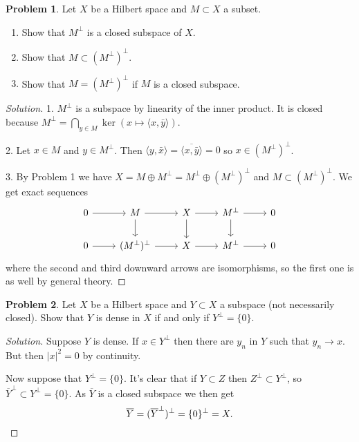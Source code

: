 \documentclass[11pt]{article}
\theoremstyle{definition}
\newtheorem{prob}{Problem}
\def\<{\langle}
\def\>{\rangle}
\begin{document}
\begin{prob}
Let $X$ be a Hilbert space and $M \subset X$ a subset.
\begin{enumerate}
\item
Show that $M^\perp$ is a closed subspace of $X$.

\item
Show that $M \subset (M^\perp)^\perp$.

\item
Show that $M = (M^\perp)^\perp$ if $M$ is a closed subspace.
\end{enumerate}
\end{prob}

\begin{proof}[Solution]
1. $M^\perp$ is a subspace by linearity of the inner product.
It is closed because $M^\perp = \bigcap_{y \in M} \ker(x \mapsto \<x, \bar y\>)$.

2. Let $x \in M$ and $y \in M^\perp$.
Then $\<y, \bar x\> = \overline{\<x, \bar y\>} = 0$ so $x \in (M^\perp)^\perp$.

3. By Problem 1 we have $X = M \oplus M^\perp = M^\perp \oplus (M^\perp)^\perp$
and $M \subset (M^\perp)^\perp$.
We get exact sequences
\[
\begin{tikzcd}
0 \ar[r] & M \ar[d] \ar[r] & X \ar[r] \ar[d] & M^\perp \ar[r] \ar[d] & 0
\\
0 \ar[r] & (M^\perp)^\perp \ar[r] & X \ar[r] & M^\perp \ar[r] & 0
\end{tikzcd}
\]
where the second and third downward arrows are isomorphisms, so the first one
is as well by general theory.
\end{proof}

\begin{prob}
Let $X$ be a Hilbert space and $Y \subset X$ a subspace (not necessarily closed).
Show that $Y$ is dense in $X$ if and only if $Y^\perp = \{ 0 \}$.
\end{prob}

\begin{proof}[Solution]
Suppose $Y$ is dense.
If $x \in Y^\perp$ then there are $y_n$ in $Y$ such that $y_n \to x$.
But then $|x|^2 = 0$ by continuity.

Now suppose that $Y^\perp = \{0\}$.
It's clear that if $Y \subset Z$ then $Z^\perp \subset Y^\perp$, so
${\overline Y}^\perp \subset Y^\perp = \{ 0 \}$.
As $\overline Y$ is a closed subspace we then get
\[
\overline Y
= ({\overline Y}^\perp)^\perp
= \{ 0 \}^\perp
= X.
\qedhere
\]
\end{proof}
\end{document}
